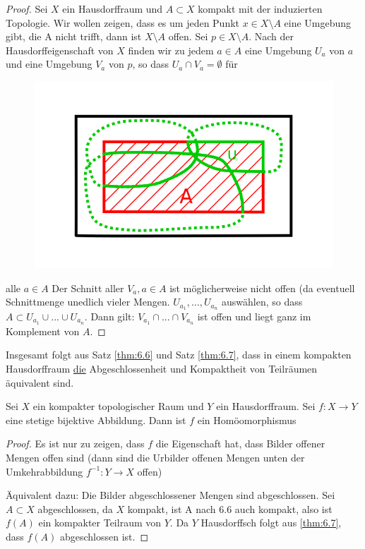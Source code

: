 \documentclass[a4paper,10pt]{scrartcl}
\begin{document}
\begin{proof}
 Sei $X$ ein Hausdorffraum und $A\subset X$ kompakt mit der induzierten Topologie. Wir wollen zeigen, dass es um jeden Punkt $x\in X\setminus A$ eine Umgebung gibt, die A nicht trifft, dann ist $X\setminus A$ offen. Sei $p\in X\setminus A$. Nach der Hausdorffeigenschaft von $X$ finden wir zu jedem $a\in A$ eine Umgebung $U_a$ von $a$ und eine Umgebung $V_a$ von $p$, so dass $U_a\cap V_a=\emptyset$ für \\
\begin{figure}[h]
\includegraphics[scale=0.5]{fig28.png}
\end{figure}
alle $a\in A$ Der Schnitt aller $V_a, a\in A$ ist möglicherweise nicht offen (da eventuell Schnittmenge unedlich vieler Mengen.
$U_{a_1},..., U_{a_n}$ auswählen, so dass $A\subset U_{a_1}\cup...\cup U_{a_n}$. Dann gilt: $V_{a_1}\cap...\cap V_{a_n}$ ist offen und liegt ganz im Komplement von $A$.
\end{proof}
Insgesamt folgt aus Satz \ref{thm:6.6} und Satz \ref{thm:6.7}, dass in einem kompakten Hausdorffraum \underline{die} Abgeschlossenheit und Kompaktheit von Teilräumen äquivalent sind.
\begin{st}\label{thm:6.8}
 Sei $X$ ein kompakter topologischer Raum und $Y$ ein Hausdorffraum. Sei $f: X\to Y$ eine stetige bijektive Abbildung. Dann ist $f$ ein Homöomorphismus
\end{st}
\begin{proof}
 Es ist nur zu zeigen, dass $f$ die Eigenschaft hat, dass Bilder offener Mengen offen sind (dann sind die Urbilder offenen Mengen unten der Umkehrabbildung $f^{-1}:Y\to X$ offen)

Äquivalent dazu: Die Bilder abgeschlossener Mengen sind abgeschlossen. Sei $A\subset X$ abgeschlossen, da $X$ kompakt, ist A nach 6.6 auch kompakt, also ist $f(A)$ ein kompakter Teilraum von $Y$. Da $Y$ Hausdorffsch folgt aus \ref{thm:6.7}, dass $f(A)$ abgeschlossen ist.
\end{proof}
\end{document}
